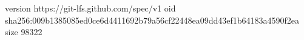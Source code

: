 version https://git-lfs.github.com/spec/v1
oid sha256:009b1385085ed0ce6d4411692b79a56cf22448ea09dd43ef1b64183a4590f2ea
size 98322
